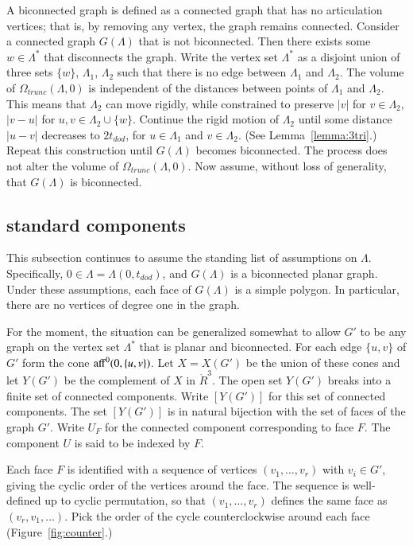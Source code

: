 \documentclass{article} %
\begin{document}
A biconnected graph is defined as a connected graph that has no
articulation vertices; that is, by removing any vertex, the
graph remains connected.
Consider a connected graph $G(\Lambda)$ that is not biconnected.
Then there exists some $w\in \Lambda^*$ that disconnects
the graph.  Write the vertex set $\Lambda^*$
as a disjoint union of three sets
$\{w\}$, $\Lambda_1$, $\Lambda_2$ such that there is no edge between
$\Lambda_1$ and $\Lambda_2$.  The volume of $\Omega_{trunc}(\Lambda,0)$
is independent of the distances between points of $\Lambda_1$ and
$\Lambda_2$.  This means that  $\Lambda_2$ can move rigidly,
while constrained to preserve $|v|$ for $v\in\Lambda_2$, $|v-u|$
for $u,v\in \Lambda_2\cup\{w\}$. 
Continue the rigid motion of $\Lambda_2$ until some distance
$|u-v|$ decreases to $2t_{dod}$, for
$u\in\Lambda_1$ and $v\in\Lambda_2$. (See Lemma~\ref{lemma:3tri}.) 
Repeat this construction until $G(\Lambda)$ becomes biconnected.  The process does not alter the volume of $\Omega_{trunc}(\Lambda,0)$.
Now assume, without loss of generality, that $G(\Lambda)$ is
biconnected.



\subsection{standard components}

This subsection continues to assume 
the standing list of assumptions on $\Lambda$.  Specifically,
$0\in\Lambda = \Lambda(0,t_{dod})$, and $G(\Lambda)$ is a 
biconnected planar graph.
Under these assumptions, each face of $G(\Lambda)$ is a simple
polygon.  In particular, there are no vertices of degree one 
in the graph.

For the moment, the situation can be generalized somewhat to
allow $G'$ to be any graph on the vertex set $\Lambda^*$ that
is planar and biconnected.
For each edge $\{u,v\}$ of $G'$ form the cone
${\operatorname{aff}}^0(0,\{u,v\})$.  Let $X=X(G')$ be the union of these
cones and let $Y(G')$ be the complement of $X$ in $\ring{R}^3$.
The open set $Y(G')$ breaks into a finite set of connected
components. 
Write $[Y(G')]$ for this set of connected
components.  The set $[Y(G')]$ is in natural bijection with
the set of faces of the graph $G'$.  Write $U_F$ for the 
connected component corresponding to face $F$.  The component
 $U$ is said to be indexed by $F$.

Each face $F$ is identified with a sequence of vertices
$(v_1,\ldots,v_r)$ with $v_i\in G'$, giving the cyclic
order of the vertices around the face.  The sequence is well-defined up to cyclic permutation, so that $(v_1,\ldots,v_r)$
defines the same face as $(v_r,v_1,\ldots)$.  Pick the
order of the cycle counterclockwise around each face
 (Figure~\ref{fig:counter}.)
\end{document}
